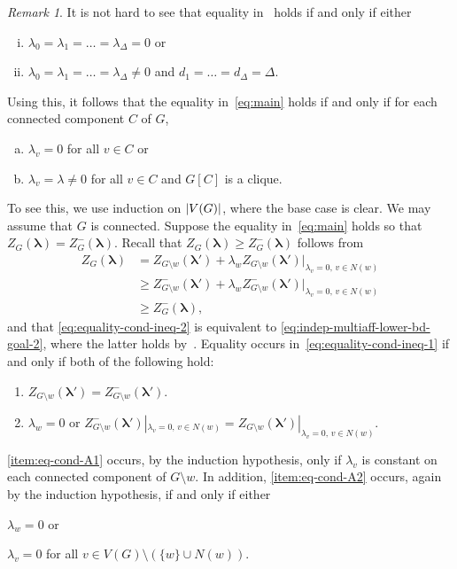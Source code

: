 \documentclass{article}
\numberwithin{equation}{section}
\theoremstyle{plain}
\theoremstyle{definition}
\theoremstyle{remark} %
\newtheorem*{remark}{Remark}
\DeclarePairedDelimiter{\abs}{\lvert}{\rvert}
\newcommand{\blambda}{\bm{\lambda}}
\begin{document}
\begin{remark}
    It is not hard to see that equality in~ holds if and only if either
    \begin{enumerate}[(i)]
        \item $\lambda_0=\lambda_1=\dots=\lambda_\Delta=0$ or
        \item $\lambda_0=\lambda_1=\dots=\lambda_\Delta\neq 0$ and $d_1=\dots=d_\Delta =\Delta$.
    \end{enumerate}
    Using this, it follows that the equality in~\eqref{eq:main} holds if and only if for each connected component \(C\) of \(G\),
    \begin{enumerate}[(a)]
        \item $\lambda_v=0$ for all $v\in C$ or
        \item $\lambda_v=\lambda\neq 0$ for all $v\in C$ and $G[C]$ is a clique.
    \end{enumerate}
    To see this, we use induction on \(\abs{V(G)}\), where the base case is clear. We may assume that \(G\) is connected. Suppose the equality in~\eqref{eq:main} holds so that \(Z_G(\blambda) = Z^-_G(\blambda)\). Recall that \(Z_G(\blambda) \ge Z^-_G(\blambda)\) follows from
    \begin{align}
        Z_G(\blambda)
        &= Z_{G \setminus w}(\blambda') + \lambda_w Z_{G \setminus w}(\blambda')|_{\lambda_v = 0,\, v \in N(w)}
            \nonumber
        \\&\ge Z^-_{G \setminus w}(\blambda') + \lambda_w Z^-_{G \setminus w}(\blambda')|_{\lambda_v = 0,\, v \in N(w)}
            \label{eq:equality-cond-ineq-1}
        \\&\ge Z^-_G(\blambda),
            \label{eq:equality-cond-ineq-2}
    \end{align}
    and that \eqref{eq:equality-cond-ineq-2} is equivalent to \eqref{eq:indep-multiaff-lower-bd-goal-2}, where the latter holds by~.
    Equality occurs in~\eqref{eq:equality-cond-ineq-1} if and only if both of the following hold:
    \begin{enumerate}[label=(A\arabic*)]
        \item \(Z_{G \setminus w}(\blambda') = Z^-_{G \setminus w}(\blambda')\).
        \label{item:eq-cond-A1}
        \item \(\lambda_w=0\) or \(Z^-_{G \setminus w}(\blambda')|_{\lambda_v = 0,\, v \in N(w)} = Z_{G \setminus w}(\blambda')|_{\lambda_v = 0,\, v \in N(w)}\).
        \label{item:eq-cond-A2}
    \end{enumerate}
    \ref{item:eq-cond-A1} occurs, by the induction hypothesis, only if \(\lambda_v\) is constant on each connected component of \(G \setminus w\).
    In addition, \ref{item:eq-cond-A2} occurs, again by the induction hypothesis, if and only if either
    \begin{enumerate*}[label=(B\arabic*)]
        \item \(\lambda_w=0\) or
        \label{item:eq-cond-B1}
        \item \(\lambda_v=0\) for all \(v\in V(G)\setminus  (\{w\}\cup N(w))\).
        \label{item:eq-cond-B2}
    \end{enumerate*}
    

\end{remark}
\end{document}
